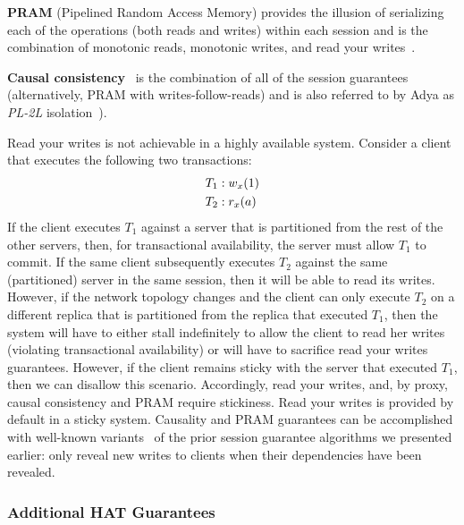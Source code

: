 \vspace{.5em}\noindent\textbf{{PRAM}} (Pipelined Random Access Memory)
provides the illusion of serializing each of the operations (both
reads and writes) within each session and is the combination of
monotonic reads, monotonic writes, and read your
writes~\cite{herlihy-art}.

\vspace{.5em}\noindent\textbf{{Causal
    consistency}}~\cite{causalmemory} is the combination of all of the
session guarantees~\cite{sessiontocausal} (alternatively, PRAM with
writes-follow-reads) and is also referred to by Adya as \textit{PL-2L}
isolation~\cite{adya}).\vspace{.5em}


Read your writes is not achievable in a highly available
system. Consider a client that executes the following two transactions:
\begin{align*}
\small\vspace{-1em}
T_1 &: w_x(1)
\\T_2 &: r_x(a)\vspace{-1em}
\end{align*}
If the client executes $T_1$ against a server that is partitioned from
the rest of the other servers, then, for transactional availability,
the server must allow $T_1$ to commit. If the same client subsequently
executes $T_2$ against the same (partitioned) server in the same
session, then it will be able to read its writes. However, if the
network topology changes and the client can only execute $T_2$ on a
different replica that is partitioned from the replica that executed
$T_1$, then the system will have to either stall indefinitely to allow
the client to read her writes (violating transactional availability)
or will have to sacrifice read your writes guarantees. However, if the
client remains sticky with the server that executed $T_1$, then we can
disallow this scenario. Accordingly, read your writes, and, by proxy,
causal consistency and PRAM require stickiness. Read your writes is
provided by default in a sticky system. Causality and PRAM guarantees
can be accomplished with well-known variants~\cite{causalmemory,
  bolton, eiger, sessionguarantees, swift} of the prior session
guarantee algorithms we presented earlier: only reveal new writes to
clients when their dependencies have been revealed.

\subsubsection{Additional HAT Guarantees}

